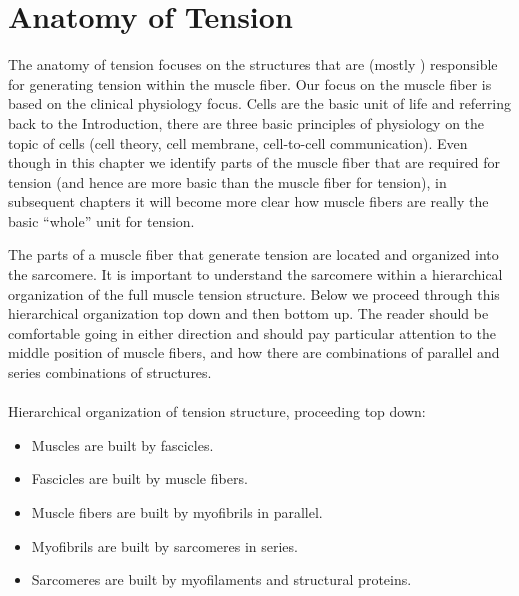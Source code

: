 \section{Anatomy of Tension}

The anatomy of tension focuses on the structures that are (mostly \footnotemark{}) responsible for generating tension within the muscle fiber. Our focus on the muscle fiber is based on the clinical physiology focus. Cells are the basic unit of life and referring back to the Introduction, there are three basic principles of physiology on the topic of cells (cell theory, cell membrane, cell-to-cell communication). Even though in this chapter we identify parts of the muscle fiber that are required for tension (and hence are more basic than the muscle fiber for tension), in subsequent chapters it will become more clear how muscle fibers are really the basic “whole” unit for tension.

The parts of a muscle fiber that generate tension are located and organized into the sarcomere. It is important to understand the sarcomere within a hierarchical organization of the full muscle tension structure. Below we proceed through this hierarchical organization top down and then bottom up. The reader should be comfortable going in either direction and should pay particular attention to the middle position of muscle fibers, and how there are combinations of parallel and series combinations of structures. 

\paragraph{}
Hierarchical organization of tension structure, proceeding top down: 
\begin{itemize}
\item Muscles are built by fascicles. 
\item Fascicles are built by muscle fibers. 
\item Muscle fibers are built by myofibrils in parallel. 
\item Myofibrils are built by sarcomeres in series. 
\item Sarcomeres are built by myofilaments and structural proteins.
\end{itemize}

